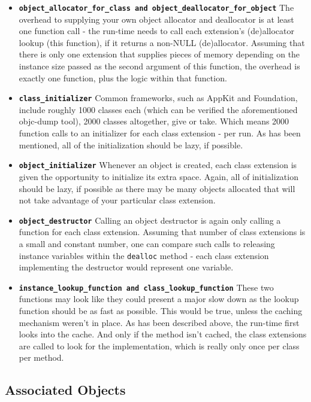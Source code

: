 \begin{itemize}
  \item{\bf{\tt{object\_allocator\_for\_class} and \tt{object\_deallocator\_for\_object}}} The overhead to supplying your own object allocator and deallocator is at least one function call - the run-time needs to call each extension's (de)allocator lookup (this function), if it returns a non-NULL (de)allocator. Assuming that there is only one extension that supplies pieces of memory depending on the instance size passed as the second argument of this function, the overhead is exactly one function, plus the logic within that function.
  \item{\bf{\tt{class\_initializer}}} Common frameworks, such as AppKit and Foundation, include roughly 1000 classes each (which can be verified the aforementioned objc-dump tool), 2000 classes altogether, give or take. Which means 2000 function calls to an initializer for each class extension - per run. As has been mentioned, all of the initialization should be lazy, if possible.
  \item{\bf{\tt{object\_initializer}}} Whenever an object is created, each class extension is given the opportunity to initialize its extra space. Again, all of initialization should be lazy, if possible as there may be many objects allocated that will not take advantage of your particular class extension.
  \item{\bf{\tt{object\_destructor}}} Calling an object destructor is again only calling a function for each class extension. Assuming that number of class extensions is a small and constant number, one can compare such calls to releasing instance variables within the \texttt{dealloc} method - each class extension implementing the destructor would represent one variable.
  \item{\bf{\tt{instance\_lookup\_function} and \tt{class\_lookup\_function}}} These two functions may look like they could present a major slow down as the lookup function should be as fast as possible. This would be true, unless the caching mechanism weren't in place. As has been described above, the run-time first looks into the cache. And only if the method isn't cached, the class extensions are called to look for the implementation, which is really only once per class per method.
\end{itemize}

\subsection{Associated Objects}

